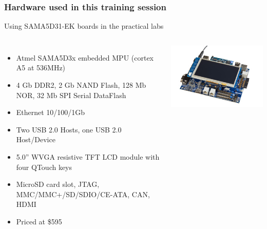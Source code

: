 \begin{frame}
\frametitle{Hardware used in this training session}
  Using SAMA5D31-EK boards in the practical labs
  \begin{columns}
    \begin{itemize}
      \item Atmel SAMA5D3x embedded MPU (cortex A5 at 536MHz)
      \item 4 Gb DDR2, 2 Gb NAND Flash, 128 Mb NOR, 32 Mb SPI Serial DataFlash
      \item Ethernet 10/100/1Gb
      \item Two USB 2.0 Hosts, one USB 2.0 Host/Device
      \item 5.0” WVGA resistive TFT LCD module with four QTouch keys
      \item MicroSD card slot, JTAG, MMC/MMC+/SD/SDIO/CE-ATA, CAN, HDMI
      \item Priced at \$595
    \end{itemize}
    \includegraphics[width=\textwidth]{slides/sama5d3-board/sama5d31ek.jpg}
  \end{columns}
\end{frame}
